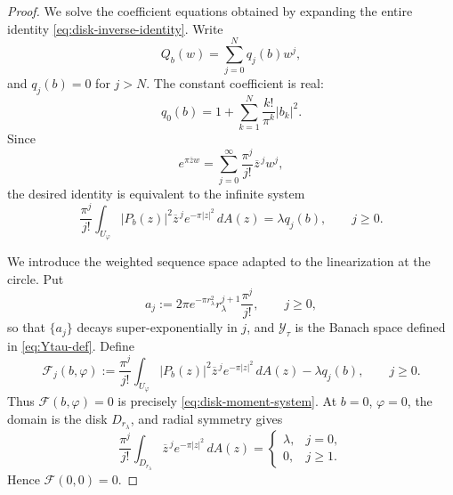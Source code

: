 \documentclass[a4paper,11pt,reqno]{amsart}
\numberwithin{equation}{section}
\theoremstyle{plain} %
\theoremstyle{definition} %
\theoremstyle{remark}
\begin{document}
\begin{proof}
We solve the coefficient equations obtained by expanding the entire identity
\eqref{eq:disk-inverse-identity}. Write
\[
Q_b(w)=\sum_{j=0}^N q_j(b)w^j,
\]
and \(q_j(b)=0\) for \(j>N\). The constant coefficient is real:
\[
q_0(b)=1+\sum_{k=1}^N \frac{k!}{\pi^k}|b_k|^2.
\]
Since
\[
e^{\pi\overline z w}
=
\sum_{j=0}^\infty \frac{\pi^j}{j!}\overline z^{\,j}w^j,
\]
the desired identity is equivalent to the infinite system
\begin{equation}\label{eq:disk-moment-system}
\frac{\pi^j}{j!}\int_{U_\varphi}
|P_b(z)|^2\overline z^{\,j}e^{-\pi |z|^2}\,dA(z)
=
\lambda q_j(b),
\qquad j\ge0 .
\end{equation}

We introduce the weighted sequence space adapted to the linearization at the
circle. Put
\begin{equation}\label{eq:aj-weight}
a_j:=2\pi e^{-\pi r_\lambda^2}r_\lambda^{j+1}\frac{\pi^j}{j!},
\qquad j\ge0,
\end{equation}
so that \(\{a_j\}\) decays super-exponentially in \(j\), and \(\mathcal Y_\tau\)
is the Banach space defined in \eqref{eq:Ytau-def}.
Define
\[
\mathcal F_j(b,\varphi)
:=
\frac{\pi^j}{j!}\int_{U_\varphi}
|P_b(z)|^2\overline z^{\,j}e^{-\pi |z|^2}\,dA(z)
-\lambda q_j(b),
\qquad j\ge0 .
\]
Thus \(\mathcal F(b,\varphi)=0\) is precisely
\eqref{eq:disk-moment-system}. At \(b=0\), \(\varphi=0\), the domain is the
disk \(D_{r_\lambda}\), and radial symmetry gives
\[
\frac{\pi^j}{j!}\int_{D_{r_\lambda}}
\overline z^{\,j}e^{-\pi |z|^2}\,dA(z)
=
\begin{cases}
\lambda, & j=0,\\
0, & j\ge1.
\end{cases}
\]
Hence \(\mathcal F(0,0)=0\).


\end{proof}
\end{document}
